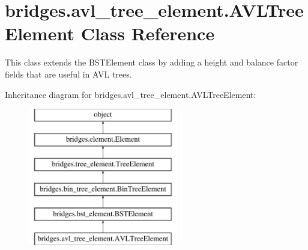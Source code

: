 \hypertarget{classbridges_1_1avl__tree__element_1_1_a_v_l_tree_element}{}\section{bridges.\+avl\+\_\+tree\+\_\+element.\+A\+V\+L\+Tree\+Element Class Reference}
\label{classbridges_1_1avl__tree__element_1_1_a_v_l_tree_element}


This class extends the B\+S\+T\+Element class by adding a height and balance factor fields that are useful in A\+VL trees.  


Inheritance diagram for bridges.\+avl\+\_\+tree\+\_\+element.\+A\+V\+L\+Tree\+Element\+:\begin{figure}[H]
\begin{center}
\leavevmode
\includegraphics[height=6.000000cm]{classbridges_1_1avl__tree__element_1_1_a_v_l_tree_element}
\end{center}
\end{figure}
